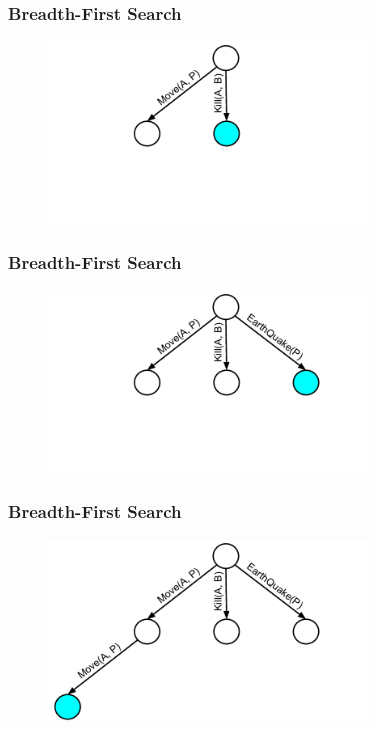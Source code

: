 \documentclass{beamer}
\begin{document}
\begin{frame}[fragile]
\frametitle{Breadth-First Search}
\begin{figure}[h]
	\includegraphics[width=8.5cm]{Diagrams/BreadthFirst/BreadthTreeTwo.pdf}
	\centering
\end{figure}
\end{frame}

\begin{frame}[fragile]
\frametitle{Breadth-First Search}
\begin{figure}[h]
	\includegraphics[width=8.5cm]{Diagrams/BreadthFirst/BreadthTreeThree.pdf}
	\centering
\end{figure}
\end{frame}

\begin{frame}[fragile]
\frametitle{Breadth-First Search}
\begin{figure}[h]
	\includegraphics[width=8.5cm]{Diagrams/BreadthFirst/BreadthTreeFour.pdf}
	\centering
\end{figure}
\end{frame}
\end{document}
